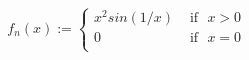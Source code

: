 \documentclass[preview]{standalone}
\begin{document}
\begin{align*}
f_{n}(x) := \begin{cases}x^{2}sin(1/x)  &  \text{ if} \ \ \  x > 0 \\0 &  \text{ if} \ \ \ x=0 \\\end{cases}
\end{align*}
\end{document}
